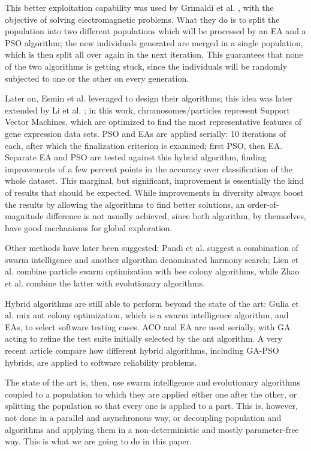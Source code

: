 \documentclass[runningheads]{llncs}
\begin{document}
This better exploitation capability was used by Grimaldi et al.
\cite{grimaldi2005genetical}, with the objective of solving
electromagnetic problems. What they do is
to split the population into two different populations which will be
processed by an EA and a PSO algorithm; the new individuals generated
are merged in a single population, which is then split all over again
in the next iteration. This guarantees that none of the two algorithms
is getting stuck, since the individuals will be randomly subjected to
one or the other on every generation.

Later on, Esmin et al. \cite{esmin2006hybrid} leveraged to design their
algorithms; this idea was
later extended by Li et al. \cite{li2008gene}; in this work,
chromosomes/particles represent Support Vector Machines, which are
optimized to find the most representative features of gene expression
data sets. PSO and EAs are applied serially: 10 iterations of each,
after which the finalization criterion is examined; first PSO, then
EA. Separate EA and PSO are tested against this hybrid algorithm,
finding improvements of a few percent points in the accuracy over
classification of the whole dataset. This marginal, but significant,
improvement is essentially the kind of results that should be
expected. While improvements in diversity always boost the results by
allowing the algorithms to find better solutions, an
order-of-magnitude difference is not usually  achieved, since both
algorithm, by themselves, have good mechanisms for global
exploration.

Other methods have later been suggested: Pandi et al. \cite{pandi2011dynamic}
suggest a combination of swarm intelligence and another algorithm
denominated harmony search; Lien et al. \cite{lien2012hybrid} combine
particle swarm optimization with bee colony algorithms, while Zhao et
al. \cite{zhao2010hybrid} combine the latter with evolutionary
algorithms.

Hybrid algorithms are still able to perform beyond the state of the
art: Gulia et al. \cite{gulia2019hybrid} mix ant colony optimization,
which is a swarm intelligence algorithm, and EAs, to select
software testing cases. ACO and EA are used serially, with GA acting
to refine the test suite initially selected by the ant algorithm. A
very recent article \cite{sangeeta2020comprehensive} compare how
different hybrid algorithms, including GA-PSO hybrids, are applied to
software reliability problems.

The state of the art is, then, use swarm intelligence and evolutionary
algorithms coupled to a population to which they are applied either
one after the other, or splitting the population so that every one is
applied to a part. This is, however, not done in a parallel and
asynchronous way, or decoupling population and algorithms and applying
them in a non-deterministic and mostly parameter-free way. This is
what we are going to do in this paper.
\end{document}
